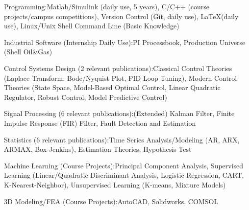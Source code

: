 \documentclass[10pt,a4paper]{article}
\begin{document}
\spacedhrule{0.5em}{-0.4em}

\inlineheadsection
{Programming:}{Matlab/Simulink (daily use, 5 years), C/C++ (course
  projects/campus competitions), Version Control (Git, daily use), \LaTeX (daily use), Linux/Unix Shell Command Line (Basic Knowledge)}

\inlineheadsection
{Industrial Software (Internship Daily Use):}{PI Processbook,
  Production Universe (Shell Oil\&Gas)}

\inlineheadsection
{Control Systems Design (2 relevant publications):}{Classical Control Theories
(Laplace Transform, Bode/Nyquist Plot, PID Loop Tuning), Modern Control Theories
(State Space, Model-Based Optimal Control, Linear Quadratic Regulator, Robust
Control, Model Predictive Control)}

\inlineheadsection
{Signal Processing (6 relevant publications):}{(Extended)
Kalman Filter, Finite Impulse Response (FIR) Filter, Fault Detection and Estimation}

\inlineheadsection
{Statistics (6 relevant publications):}{Time Series Analysis/Modeling (AR, ARX,
  ARMAX, Box-Jenkins), Estimation Theories, Hypothesis Test}

\inlineheadsection
{Machine Learning (Course Projects):}{Principal Component Analysis,
  Supervised Learning (Linear/Quadratic Discriminant Analysis, Logistic
  Regression, CART, K-Nearest-Neighbor), Unsupervised Learning (K-means, Mixture
  Models)}

\inlineheadsection
{3D Modeling/FEA (Course Projects):}{AutoCAD, Solidworks, COMSOL}

\spacedhrule{2em}{0em}

\end{document}
